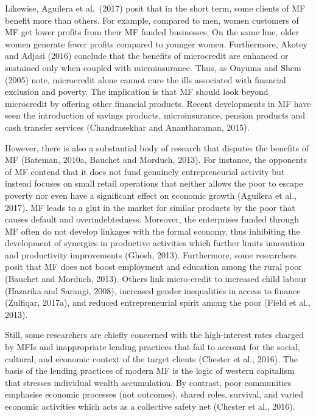 \documentclass[a4paper, nobind]{templates/ociamthesis}
\begin{document}
Likewise, Aguilera et al.~(2017) posit that in the short term, some clients of MF benefit more than others. For example, compared to men, women customers of MF get lower profits from their MF funded businesses. On the same line, older women generate fewer profits compared to younger women. Furthermore, Akotey and Adjasi (2016) conclude that the benefits of microcredit are enhanced or sustained only when coupled with microinsurance. Thus, as Onyuma and Shem (2005) note, microcredit alone cannot cure the ills associated with financial exclusion and poverty. The implication is that MF should look beyond microcredit by offering other financial products. Recent developments in MF have seen the introduction of savings products, microinsurance, pension products and cash transfer services (Chandrasekhar and Anantharaman, 2015).

However, there is also a substantial body of research that disputes the benefits of MF (Bateman, 2010a, Bauchet and Morduch, 2013). For instance, the opponents of MF contend that it does not fund genuinely entrepreneurial activity but instead focuses on small retail operations that neither allows the poor to escape poverty nor even have a significant effect on economic growth (Aguilera et al., 2017). MF leads to a glut in the market for similar products by the poor that causes default and overindebtedness. Moreover, the enterprises funded through MF often do not develop linkages with the formal economy, thus inhibiting the development of synergies in productive activities which further limits innovation and productivity improvements (Ghosh, 2013). Furthermore, some researchers posit that MF does not boost employment and education among the rural poor (Bauchet and Morduch, 2013). Others link micro-credit to increased child labour (Hazarika and Sarangi, 2008), increased gender inequalities in access to finance (Zulfiqar, 2017a), and reduced entrepreneurial spirit among the poor (Field et al., 2013).

Still, some researchers are chiefly concerned with the high-interest rates charged by MFIs and inappropriate lending practices that fail to account for the social, cultural, and economic context of the target clients (Chester et al., 2016). The basis of the lending practices of modern MF is the logic of western capitalism that stresses individual wealth accumulation. By contrast, poor communities emphasise economic processes (not outcomes), shared roles, survival, and varied economic activities which acts as a collective safety net (Chester et al., 2016).
\end{document}
